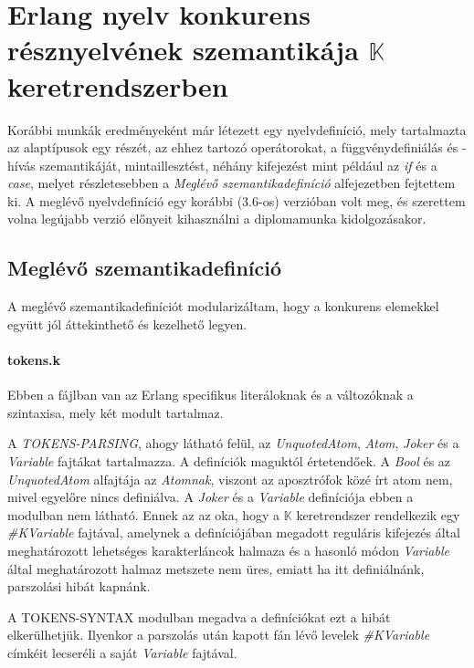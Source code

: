 \section{Erlang nyelv konkurens résznyelvének szemantikája $\mathbb{K}$ keretrendszerben}
Korábbi munkák eredményeként már létezett egy nyelvdefiníció, mely tartalmazta az alaptípusok egy részét, az ehhez tartozó operátorokat, a függvénydefiniálás és -hívás szemantikáját, mintaillesztést, néhány kifejezést mint például az \textit{if} és a \textit{case}, melyet részletesebben a \textit{Meglévő szemantikadefiníció} alfejezetben fejtettem ki. A meglévő nyelvdefiníció egy korábbi (3.6-os) verzióban volt meg, és szerettem volna legújabb verzió előnyeit kihasználni a diplomamunka kidolgozásakor.

\subsection{Meglévő szemantikadefiníció}
A meglévő szemantikadefiníciót modularizáltam, hogy a konkurens elemekkel együtt jól áttekinthető és kezelhető legyen.

\paragraph{tokens.k}
Ebben a fájlban van az Erlang specifikus literáloknak és a változóknak a szintaxisa, mely két modult tartalmaz.



A \textit{TOKENS-PARSING}, ahogy látható felül, az \textit{UnquotedAtom}, \textit{Atom}, \textit{Joker} és a \textit{Variable} fajtákat tartalmazza. A definíciók maguktól értetendőek. A \textit{Bool} és az \textit{UnquotedAtom} alfajtája az \textit{Atomnak}, viszont az aposztrófok közé írt atom nem, mivel egyelőre nincs definiálva. A \textit{Joker} és a \textit{Variable} definíciója ebben a modulban nem látható. Ennek az az oka, hogy a $\mathbb{K}$ keretrendszer rendelkezik egy \textit{\#KVariable} fajtával, amelynek a definíciójában megadott reguláris kifejezés által meghatározott lehetséges karakterláncok halmaza és a hasonló módon \textit{Variable} által meghatározott halmaz metszete nem üres, emiatt ha itt definiálnánk, parszolási hibát kapnánk.
\newline


A TOKENS-SYNTAX modulban megadva a definíciókat ezt a hibát elkerülhetjük. Ilyenkor a parszolás után kapott fán lévő levelek \textit{\#KVariable} címkéit lecseréli a saját \textit{Variable} fajtával.

